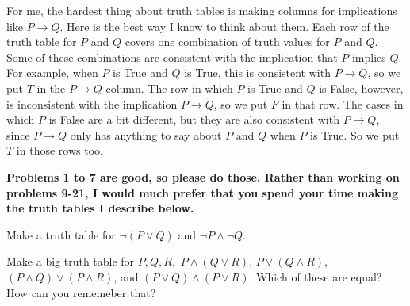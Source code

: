 For me, the hardest thing about truth tables is making columns for implications like $P \to Q$.
Here is the best way I know to think about them.
Each row of the truth table for $P$ and $Q$ covers one combination of truth values for $P$ and $Q$.
Some of these combinations are consistent with the implication that $P$ implies $Q$.
For example, when $P$ is True and $Q$ is True, this is consistent with $P \to Q$, so we put $T$ in the $P \to Q$ column.
The row in which $P$ is True and $Q$ is False, however, is inconsistent with the implication $P \to Q$, so we put $F$ in that row.
The cases in which $P$ is False are a bit different, but they are also consistent with $P \to Q$, since $P \to Q$ only has anything to say about $P$ and $Q$ when $P$ is True.
So we put $T$ in those rows too.

{\bf Problems 1 to 7 are good, so please do those.  
Rather than working on problems 9-21, I would much prefer that you spend your time making the truth tables I describe below.
\blist{0.0in}
\item Make a truth table for $\neg (P \vee Q)$ and $\neg P \wedge \neg Q$.
\item Make a big truth table for $P, Q, R,$ $P \wedge (Q \vee R)$, $P \vee (Q \wedge R)$, $(P \wedge Q) \vee (P \wedge R)$, and $(P \vee Q) \wedge (P \vee R)$.  Which of these are equal?  How can you rememeber that?
\elist
}
\vfill          %
